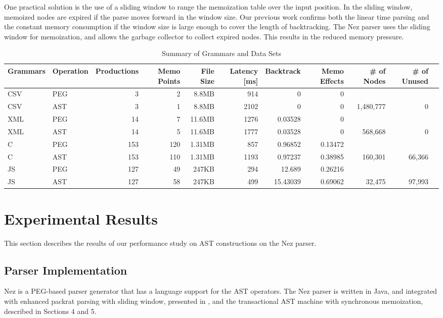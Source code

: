 \documentclass[JIP]{ipsj}
\begin{document}
One practical solution is the use of a sliding window to range the memoization table over the input position. In the sliding window, memoized nodes are expired if the parse moves forward in the window size. Our previous work \cite{PRO101} confirms both the linear time parsing and the constant memory consumption if the window size is large enough to cover the length of backtracking. The Nez parser uses the sliding window for memoization, and allows the garbage collector to collect expired nodes. This results in the reduced memory pressure.  

\begin{table*}[tb]
\caption{Summary of Grammars and Data Sets}
\label{table:grammars}
\begin{tabular}{llrr|rrrrrrr} \hline
Grammars & Operation &Productions & Memo Points & File Size & Latency [ms] & Backtrack &  Memo Effects & \# of Nodes & \# of Unused \\ \hline
CSV & PEG & 3 & 2 & 8.8MB & 914 & 0 &  0 &  &  \\
CSV & AST &  3 & 1 & 8.8MB & 2102 & 0 &  0 & 1,480,777 & 0 \\
XML & PEG & 14 & 7 & 11.6MB & 1276 & 0.03528 & 0 &  &  \\
XML & AST  & 14 & 5 & 11.6MB & 1777 & 0.03528 &  0 & 568,668 & 0 \\
C & PEG & 153 & 120 & 1.31MB & 857 & 0.96852 &  0.13472 &  &  \\
C & AST & 153 & 110 & 1.31MB & 1193 & 0.97237 &  0.38985 & 160,301 & 66,366 \\
JS & PEG & 127 & 49 & 247KB & 294 & 12.689 &  0.26216 &  &  \\
JS & AST  & 127 & 58 & 247KB & 499 & 15.43039 &  0.69062 & 32,475 & 97,993 \\ 
\hline
\end{tabular}
\end{table*}  

\section{Experimental Results}

This section describes the results of our performance study on AST constructions on the Nez parser. 

\subsection{Parser Implementation}

Nez is a PEG-based parser generator that has a language support for the AST operators.
The Nez parser is written in Java, and integrated with enhanced packrat parsing with sliding window, presented in \cite{PRO101}, and the transactional AST machine with synchronous memoization, described in Sections 4 and 5. 
\end{document}
